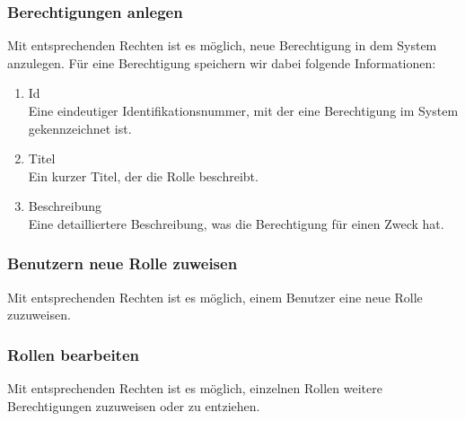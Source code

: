 \documentclass[titlepage]{article}
\begin{document}
\subsubsection{Berechtigungen anlegen}

Mit entsprechenden Rechten ist es möglich, neue Berechtigung in dem System anzulegen. Für eine Berechtigung speichern wir dabei folgende Informationen:
\begin{enumerate}
	\item Id\\
	Eine eindeutiger Identifikationsnummer, mit der eine Berechtigung im System gekennzeichnet ist.
	\item Titel\\
	Ein kurzer Titel, der die Rolle beschreibt.
	\item Beschreibung\\
	Eine detailliertere Beschreibung, was die Berechtigung für einen Zweck hat.
\end{enumerate}

\subsubsection{Benutzern neue Rolle zuweisen}

Mit entsprechenden Rechten ist es möglich, einem Benutzer eine neue Rolle zuzuweisen.

\subsubsection{Rollen bearbeiten}

Mit entsprechenden Rechten ist es möglich, einzelnen Rollen weitere Berechtigungen zuzuweisen oder zu entziehen.
\end{document}
